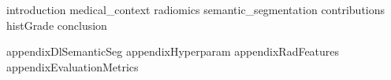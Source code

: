 \documentclass[]{memoir}
\begin{document}








\tableofcontents


\newpage
\printacronyms[include-classes=abbrev,name=Abbreviations]
\newpage

{introduction}
{medical_context}
{radiomics}
{semantic_segmentation}
{contributions}
{histGrade}
{conclusion}



\begin{appendices}
{appendixDlSemanticSeg}
{appendixHyperparam}
{appendixRadFeatures}
{appendixEvaluationMetrics}
\end{appendices}

\newpage
%
\printbibliography[heading=bibintoc]
	
	
\end{document}
